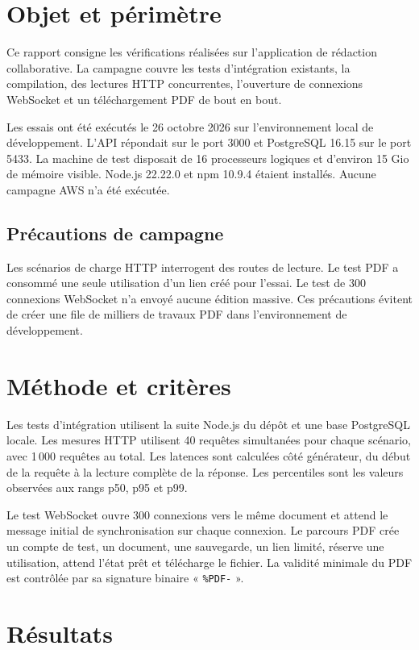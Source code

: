 \documentclass[11pt,a4paper,oneside]{report}
\begin{document}
\tableofcontents
\clearpage
{}

\chapter{Objet et périmètre}
Ce rapport consigne les vérifications réalisées sur l’application de rédaction collaborative. La campagne couvre les tests d’intégration existants, la compilation, des lectures HTTP concurrentes, l’ouverture de connexions WebSocket et un téléchargement PDF de bout en bout.

Les essais ont été exécutés le 26 octobre 2026 sur l’environnement local de développement. L’API répondait sur le port 3000 et PostgreSQL 16.15 sur le port 5433. La machine de test disposait de 16 processeurs logiques et d’environ 15 Gio de mémoire visible. Node.js 22.22.0 et npm 10.9.4 étaient installés. Aucune campagne AWS n’a été exécutée.

\section{Précautions de campagne}
Les scénarios de charge HTTP interrogent des routes de lecture. Le test PDF a consommé une seule utilisation d’un lien créé pour l’essai. Le test de 300 connexions WebSocket n’a envoyé aucune édition massive. Ces précautions évitent de créer une file de milliers de travaux PDF dans l’environnement de développement.

\chapter{Méthode et critères}
Les tests d’intégration utilisent la suite Node.js du dépôt et une base PostgreSQL locale. Les mesures HTTP utilisent 40 requêtes simultanées pour chaque scénario, avec 1\,000 requêtes au total. Les latences sont calculées côté générateur, du début de la requête à la lecture complète de la réponse. Les percentiles sont les valeurs observées aux rangs p50, p95 et p99.

Le test WebSocket ouvre 300 connexions vers le même document et attend le message initial de synchronisation sur chaque connexion. Le parcours PDF crée un compte de test, un document, une sauvegarde, un lien limité, réserve une utilisation, attend l’état prêt et télécharge le fichier. La validité minimale du PDF est contrôlée par sa signature binaire « \texttt{\%PDF-} ».

\chapter{Résultats}
\end{document}
